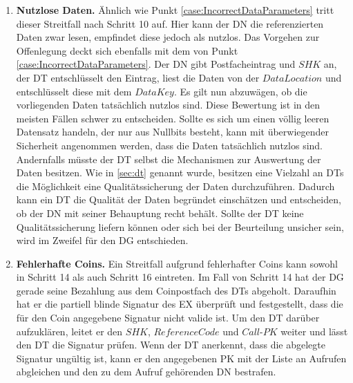 \documentclass[
	fontsize=11pt,
	headings=small,
	parskip=half,           %
	bibliography=totoc,
	numbers=noenddot,       %
	open=any,               %
]{scrreprt}
\begin{document}
\begin{enumerate}
    \item \textbf{Nutzlose Daten.}\label{case:UselessData}
    Ähnlich wie Punkt \ref{case:IncorrectDataParameters} tritt dieser Streitfall nach Schritt 10 auf. Hier kann der DN die referenzierten Daten zwar lesen, empfindet diese jedoch als nutzlos. Das Vorgehen zur Offenlegung deckt sich ebenfalls mit dem von Punkt \ref{case:IncorrectDataParameters}. Der DN gibt Postfacheintrag und $SHK$ an, der DT entschlüsselt den Eintrag, liest die Daten von der $DataLocation$ und entschlüsselt diese mit dem $DataKey$. Es gilt nun abzuwägen, ob die vorliegenden Daten tatsächlich nutzlos sind. Diese Bewertung ist in den meisten Fällen schwer zu entscheiden. Sollte es sich um einen völlig leeren Datensatz handeln, der nur aus Nullbits besteht, kann mit überwiegender Sicherheit angenommen werden, dass die Daten tatsächlich nutzlos sind. Andernfalls müsste der DT selbst die Mechanismen zur Auswertung der Daten besitzen. Wie in \ref{sec:dt} genannt wurde, besitzen eine Vielzahl an DTs die Möglichkeit eine Qualitätssicherung der Daten durchzuführen. Dadurch kann ein DT die Qualität der Daten begründet einschätzen und entscheiden, ob der DN mit seiner Behauptung recht behält. Sollte der DT keine Qualitätssicherung liefern können oder sich bei der Beurteilung unsicher sein, wird im Zweifel für den DG entschieden.

    \item \textbf{Fehlerhafte Coins.}\label{case:IncorrectCoins}
    Ein Streitfall aufgrund fehlerhafter Coins kann sowohl in Schritt 14 als auch Schritt 16 eintreten. Im Fall von Schritt 14 hat der DG gerade seine Bezahlung aus dem Coinpostfach des DTs abgeholt. Daraufhin hat er die partiell blinde Signatur des EX überprüft und festgestellt, dass die für den Coin angegebene Signatur nicht valide ist. Um den DT darüber aufzuklären, leitet er den $SHK$, $ReferenceCode$ und $Call$-$PK$ weiter und lässt den DT die Signatur prüfen. Wenn der DT anerkennt, dass die abgelegte Signatur ungültig ist, kann er den angegebenen PK mit der Liste an Aufrufen abgleichen und den zu dem Aufruf gehörenden DN bestrafen.\\
    

\end{enumerate}
\end{document}
